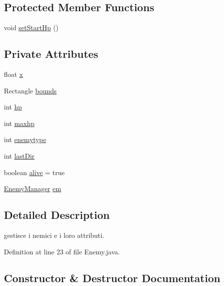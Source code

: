\subsection*{Protected Member Functions}
\begin{DoxyCompactItemize}
\item 
void \hyperlink{classenemies_1_1_enemy_a36ff8539de48d58a670cd19251abe658}{set\+Start\+Hp} ()
\end{DoxyCompactItemize}
\subsection*{Private Attributes}
\begin{DoxyCompactItemize}
\item 
float \hyperlink{classenemies_1_1_enemy_ad0da36b2558901e21e7a30f6c227a45e}{x}
\item 
Rectangle \hyperlink{classenemies_1_1_enemy_a62df0866a4faf552c81108aff64e8eff}{bounds}
\item 
int \hyperlink{classenemies_1_1_enemy_a9aa790f93d2d067a4f5608fdb8409f94}{hp}
\item 
int \hyperlink{classenemies_1_1_enemy_ab00f83dbe0fccddd104bd088c528cd13}{maxhp}
\item 
int \hyperlink{classenemies_1_1_enemy_aac2aa7795cecac1072a281ed3b323443}{enemytype}
\item 
int \hyperlink{classenemies_1_1_enemy_ac435470ac2e2afb54b515dc834ec1591}{last\+Dir}
\item 
boolean \hyperlink{classenemies_1_1_enemy_a14a3219f24517ddf3acada17f436cfd8}{alive} = true
\item 
\hyperlink{classmanagers_1_1_enemy_manager}{Enemy\+Manager} \hyperlink{classenemies_1_1_enemy_ae3966a6508c5a21dafa875aebfee1dfe}{em}
\end{DoxyCompactItemize}


\subsection{Detailed Description}
gestisce i nemici e i loro attributi. 

Definition at line 23 of file Enemy.\+java.



\subsection{Constructor \& Destructor Documentation}
\mbox{\label{classenemies_1_1_enemy_afa298133293bebcdafef5956df1d1911}} 
